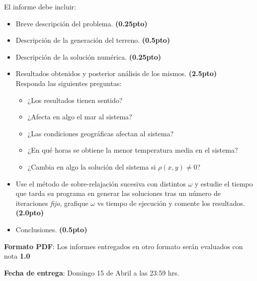 \documentclass[letterpaper,11pt]{article} %
\begin{document}

El informe debe incluir:

\begin{itemize}
	\item Breve descripción del problema. \textbf{(0.25pto)}
	\item Descripción de la generación del terreno. \textbf{(0.5pto)}
	\item Descripción de la solución numérica.  \textbf{(0.25pto)}
	\item Resultados obtenidos y posterior análisis de los mismos.  \textbf{(2.5pto)} \\Responda las siguientes preguntas:
	\vspace{-0.1cm}
	\begin{itemize}
		\item ¿Los resultados tienen sentido?
		\item ¿Afecta en algo el mar al sistema?
		\item ¿Las condiciones geográficas afectan al sistema?
		\item ¿En qué horas se obtiene la menor temperatura media en el sistema?
		\item ¿Cambia en algo la solución del sistema si $\rho(x,y) \neq 0$?
	\end{itemize}
	\item Use el método de sobre-relajación sucesiva con distintos $\omega$ y estudie el tiempo que tarda su programa en generar las soluciones tras un número de iteraciones \textit{fijo}, grafique $\omega$ vs tiempo de ejecución y comente los resultados.  \textbf{(2.0pto)}
	\item Conclusiones. \textbf{(0.5pto)}
\end{itemize}

\textbf{Formato PDF}: Los informes entregados en otro formato serán evaluados con nota \textbf{1.0} \\
\vspace{-0.2cm}
\par \textbf{Fecha de entrega}: Domingo 15 de Abril a las 23:59 hrs.

\newpage
{}
\end{document}
